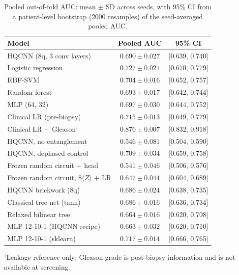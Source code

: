 \begin{table}[t]
\centering
\caption{Pooled out-of-fold AUC: mean $\pm$ SD across seeds, with 95\% CI from a patient-level bootstrap (2000 resamples) of the seed-averaged pooled AUC.}
\label{tab:v3_pooled}
\small
\begin{tabular}{lcc}
\toprule
Model & Pooled AUC & 95\% CI \\
\midrule
HQCNN (8q, 3 conv layers) & $0.690 \pm 0.027$ & [0.639, 0.740] \\
Logistic regression & $0.727 \pm 0.021$ & [0.670, 0.779] \\
RBF-SVM & $0.704 \pm 0.016$ & [0.652, 0.757] \\
Random forest & $0.693 \pm 0.017$ & [0.642, 0.744] \\
MLP (64, 32) & $0.697 \pm 0.030$ & [0.644, 0.752] \\
Clinical LR (pre-biopsy) & $0.715 \pm 0.013$ & [0.649, 0.779] \\
Clinical LR + Gleason$^{\dagger}$ & $0.876 \pm 0.007$ & [0.832, 0.918] \\
HQCNN, no entanglement & $0.546 \pm 0.081$ & [0.504, 0.590] \\
HQCNN, dephased control & $0.709 \pm 0.034$ & [0.659, 0.758] \\
Frozen random circuit + head & $0.541 \pm 0.046$ & [0.506, 0.576] \\
Frozen random circuit, 8$\langle Z\rangle$ + LR & $0.647 \pm 0.044$ & [0.604, 0.689] \\
HQCNN brickwork (8q) & $0.686 \pm 0.024$ & [0.638, 0.735] \\
Classical tree net (tanh) & $0.686 \pm 0.016$ & [0.636, 0.734] \\
Relaxed bilinear tree & $0.664 \pm 0.016$ & [0.620, 0.708] \\
MLP 12-10-1 (HQCNN recipe) & $0.663 \pm 0.032$ & [0.620, 0.710] \\
MLP 12-10-1 (sklearn) & $0.717 \pm 0.014$ & [0.666, 0.765] \\
\bottomrule
\end{tabular}
\par\smallskip\footnotesize $^{\dagger}$Leakage reference only: Gleason grade is post-biopsy information and is not available at screening.
\end{table}
